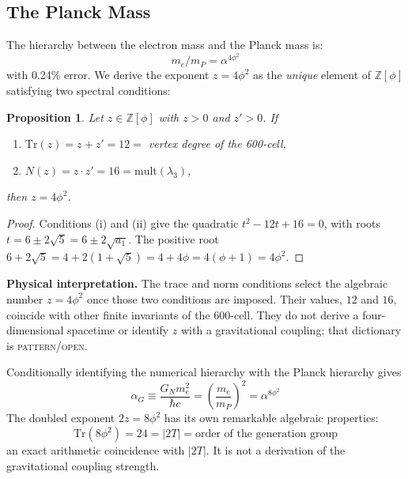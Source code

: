 \documentclass[12pt,a4paper]{article}
\newtheorem{proposition}{Proposition}
\theoremstyle{definition}
\begin{document}
\subsection{The Planck Mass}

The hierarchy between the electron mass and the Planck mass is:
\begin{equation}
\boxed{m_e / m_P = \alpha^{4\phi^2}}
\label{eq:planck}
\end{equation}
with 0.24\% error. We derive the exponent $z = 4\phi^2$ as the \emph{unique} element of $\mathbb{Z}[\phi]$ satisfying two spectral conditions:

\begin{proposition}
Let $z \in \mathbb{Z}[\phi]$ with $z > 0$ and $z' > 0$. If
\begin{enumerate}
\item[(i)] $\mathrm{Tr}(z) = z + z' = 12 = $ vertex degree of the 600-cell,
\item[(ii)] $N(z) = z \cdot z' = 16 = \mathrm{mult}(\lambda_3)$,
\end{enumerate}
then $z = 4\phi^2$.
\end{proposition}

\begin{proof}
Conditions (i) and (ii) give the quadratic $t^2 - 12t + 16 = 0$, with roots $t = 6 \pm 2\sqrt{5} = 6 \pm 2\sqrt{a_1}$. The positive root $6 + 2\sqrt{5} = 4 + 2(1 + \sqrt{5}) = 4 + 4\phi = 4(\phi + 1) = 4\phi^2$.
\end{proof}

\textbf{Physical interpretation.} The trace and norm conditions select the algebraic number $z=4\phi^2$ once those two conditions are imposed.  Their values, $12$ and $16$, coincide with other finite invariants of the 600-cell.  They do not derive a four-dimensional spacetime or identify $z$ with a gravitational coupling; that dictionary is \textsc{pattern/open}.

Conditionally identifying the numerical hierarchy with the Planck hierarchy gives
\begin{equation}
\alpha_G \equiv \frac{G_N m_e^2}{\hbar c} = \left(\frac{m_e}{m_P}\right)^2 = \alpha^{8\phi^2}
\end{equation}
The doubled exponent $2z = 8\phi^2$ has its own remarkable algebraic properties:
\begin{equation}
\text{Tr}(8\phi^2) = 24 = |2T| = \text{order of the generation group}
\end{equation}
an exact arithmetic coincidence with $|2T|$.  It is not a derivation of the gravitational coupling strength.
\end{document}
